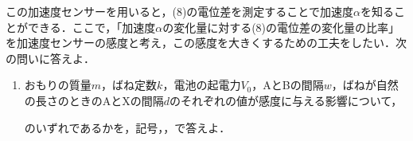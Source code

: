 この加速度センサーを用いると，(8)の電位差を測定することで加速度$\alpha$を知ることができる．ここで，「加速度$\alpha$の変化量に対する(8)の電位差の変化量の比率」を加速度センサーの感度と考え，この感度を大きくするための工夫をしたい．次の問いに答えよ．
\begin{enumerate}[(1), resume]
  \item おもりの質量$m$，ばね定数$k$，電池の起電力$V_0$，AとBの間隔$w$，ばねが自然の長さのときのAとXの間隔$d$のそれぞれの値が感度に与える影響について，


    のいずれであるかを，記号，，で答えよ．
\end{enumerate}




